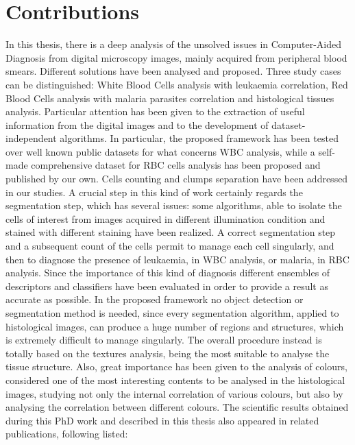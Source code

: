\documentclass[final,a4paper,12pt,english]{UnicaPhdThesis3}
\begin{document}
\section{Contributions} %
In this thesis, there is a deep analysis of the unsolved issues in Computer-Aided Diagnosis from digital microscopy images, mainly acquired from peripheral blood smears. Different solutions have been analysed and proposed. Three study cases can be distinguished: White Blood Cells analysis with leukaemia correlation, Red Blood Cells analysis with malaria parasites correlation and histological tissues analysis. Particular attention has been given to the extraction of useful information from the digital images and to the development of dataset-independent algorithms. In particular, the proposed framework has been tested over well known public datasets for what concerns WBC analysis, while a self-made comprehensive dataset for RBC cells analysis has been proposed and published by our own. Cells counting and clumps separation have been addressed in our studies. A crucial step in this kind of work certainly regards the segmentation step, which has several issues: some algorithms, able to isolate the cells of interest from images acquired in different illumination condition and stained with different staining have been realized. A correct segmentation step and a subsequent count of the cells permit to manage each cell singularly, and then to diagnose the presence of leukaemia, in WBC analysis, or malaria, in RBC analysis. Since the importance of this kind of diagnosis different ensembles of descriptors and classifiers have been evaluated in order to provide a result as accurate as possible. In the proposed framework no object detection or segmentation method is needed, since every segmentation algorithm, applied to histological images, can produce a huge number of regions and structures, which is extremely difficult to manage singularly. The overall procedure instead is totally based on the textures analysis, being the most suitable to analyse the tissue structure. Also, great importance has been given to the analysis of colours, considered one of the most interesting contents to be analysed in the histological images, studying not only the internal correlation of various colours, but also by analysing the correlation between different colours.
The scientific results obtained during this PhD work and described in this thesis also appeared in related publications, following listed:
\end{document}
